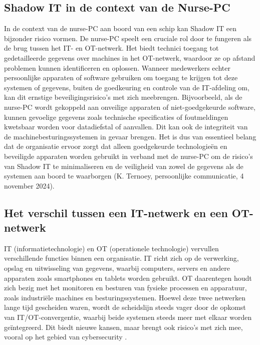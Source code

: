 \subsection{Shadow IT in de context van de Nurse-PC}
In de context van de nurse-PC aan boord van een schip kan Shadow IT een bijzonder risico vormen. De nurse-PC speelt een cruciale rol door te fungeren als de brug 
tussen het IT- en OT-netwerk. Het biedt technici toegang tot gedetailleerde gegevens over machines in het OT-netwerk, waardoor ze op afstand problemen kunnen 
identificeren en oplossen. Wanneer medewerkers echter persoonlijke apparaten of software gebruiken om toegang te krijgen tot deze systemen of gegevens, buiten de 
goedkeuring en controle van de IT-afdeling om, kan dit ernstige beveiligingsrisico's met zich meebrengen. Bijvoorbeeld, als de nurse-PC wordt gekoppeld aan onveilige 
apparaten of niet-goedgekeurde software, kunnen gevoelige gegevens zoals technische specificaties of foutmeldingen kwetsbaar worden voor datadiefstal of aanvallen. 
Dit kan ook de integriteit van de machinebesturingssystemen in gevaar brengen. Het is dus van essentieel belang dat de organisatie ervoor zorgt dat alleen goedgekeurde 
technologieën en beveiligde apparaten worden gebruikt in verband met de nurse-PC om de risico's van Shadow IT te minimaliseren en de veiligheid van zowel de gegevens 
als de systemen aan boord te waarborgen (K. Ternoey, persoonlijke communicatie, 4 november 2024).

\subsection{Het verschil tussen een IT-netwerk en een OT-netwerk}
IT (informatietechnologie) en OT (operationele technologie) vervullen verschillende functies binnen een organisatie. IT richt zich op de verwerking, opslag en 
uitwisseling van gegevens, waarbij computers, servers en andere apparaten zoals smartphones en tablets worden gebruikt. OT daarentegen houdt zich bezig met het 
monitoren en besturen van fysieke processen en apparatuur, zoals industriële machines en besturingssystemen. Hoewel deze twee netwerken lange tijd gescheiden waren, 
wordt de scheidslijn steeds vager door de opkomst van IT/OT-convergentie, waarbij beide systemen steeds meer met elkaar worden geïntegreerd. Dit biedt nieuwe kansen, 
maar brengt ook risico’s met zich mee, vooral op het gebied van cybersecurity \autocite{Wangsness2023ITOT}.

